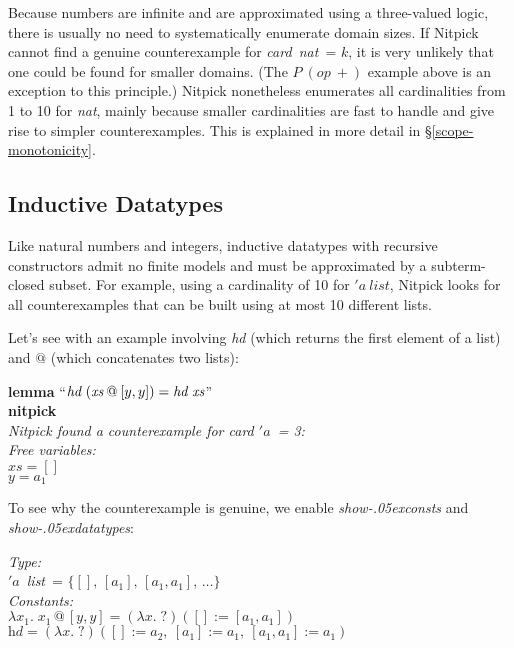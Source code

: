 \documentclass[a4paper,12pt]{article}
\def\unk{{?}}
\def\unkef{(\lambda x.\; \unk)}
\def\unr{\ldots}
\renewcommand\_{\hbox{\textunderscore\kern-.05ex}}
\begin{document}
Because numbers are infinite and are approximated using a three-valued logic,
there is usually no need to systematically enumerate domain sizes. If Nitpick
cannot find a genuine counterexample for \textit{card~nat}~= $k$, it is very
unlikely that one could be found for smaller domains. (The $P~(\textit{op}~{+})$
example above is an exception to this principle.) Nitpick nonetheless enumerates
all cardinalities from 1 to 10 for \textit{nat}, mainly because smaller
cardinalities are fast to handle and give rise to simpler counterexamples. This
is explained in more detail in \S\ref{scope-monotonicity}.

\subsection{Inductive Datatypes}
\label{inductive-datatypes}

Like natural numbers and integers, inductive datatypes with recursive
constructors admit no finite models and must be approximated by a subterm-closed
subset. For example, using a cardinality of 10 for ${'}a~\textit{list}$,
Nitpick looks for all counterexamples that can be built using at most 10
different lists.

Let's see with an example involving \textit{hd} (which returns the first element
of a list) and $@$ (which concatenates two lists):

\prew
\textbf{lemma} ``$\textit{hd}~(\textit{xs} \mathbin{@} [y, y]) = \textit{hd}~\textit{xs\/}$'' \\
\textbf{nitpick} \\[2\smallskipamount]
\slshape Nitpick found a counterexample for \textit{card} $'a$~= 3: \\[2\smallskipamount]
\hbox{}\qquad Free variables: \nopagebreak \\
\hbox{}\qquad\qquad $\textit{xs} = []$ \\
\hbox{}\qquad\qquad $\textit{y} = a_1$
\postw

To see why the counterexample is genuine, we enable \textit{show\_consts}
and \textit{show\_\allowbreak datatypes}:

\prew
{\slshape Type:} \\
\hbox{}\qquad $'a$~\textit{list}~= $\{[],\, [a_1],\, [a_1, a_1],\, \unr\}$ \\
{\slshape Constants:} \\
\hbox{}\qquad $\lambda x_1.\; x_1 \mathbin{@} [y, y] = \unkef([] := [a_1, a_1])$ \\
\hbox{}\qquad $\textit{hd} = \unkef([] := a_2,\> [a_1] := a_1,\> [a_1, a_1] := a_1)$
\postw
\end{document}

